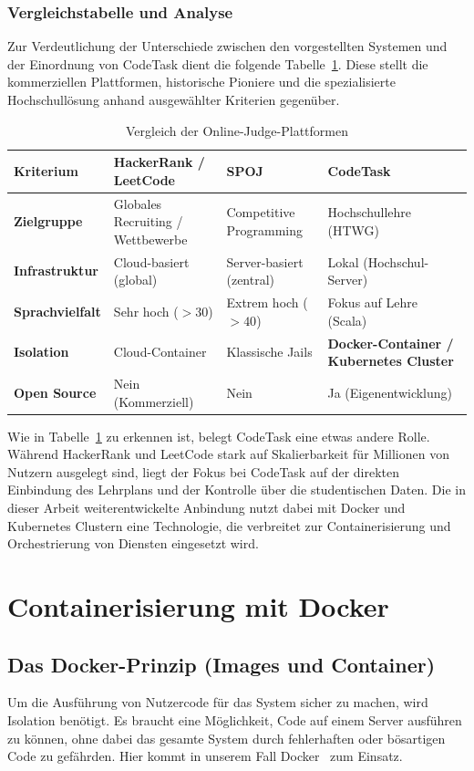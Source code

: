 	\subsubsection{Vergleichstabelle und Analyse}
	Zur Verdeutlichung der Unterschiede zwischen den vorgestellten Systemen und der Einordnung von CodeTask dient die folgende Tabelle~\ref{tab:vergleich_systeme}. Diese stellt die kommerziellen Plattformen,
	historische Pioniere und die spezialisierte Hochschullösung anhand ausgewählter Kriterien gegenüber.
	   \begin{table}[htbp]
		\centering
		\caption{Vergleich der Online-Judge-Plattformen}
		\label{tab:vergleich_systeme}
			\begin{tabular}{p{3cm} p{3.5cm} p{3.5cm} p{3.5cm}}
				\textbf{Kriterium} & \textbf{HackerRank / LeetCode} & \textbf{SPOJ} & \textbf{CodeTask} \\
				\hline
				\textbf{Zielgruppe} & Globales Recruiting / Wettbewerbe & Competitive Programming & Hochschullehre (HTWG) \\
				\textbf{Infrastruktur} & Cloud-basiert (global) & Server-basiert (zentral) & Lokal (Hochschul-Server) \\
				\textbf{Sprachvielfalt} & Sehr hoch ($>30$) & Extrem hoch ($>40$) & Fokus auf Lehre (Scala) \\
				\textbf{Isolation} & Cloud-Container & Klassische Jails & \textbf{Docker-Container / Kubernetes Cluster} \\
				\textbf{Open Source} & Nein (Kommerziell) & Nein & Ja (Eigenentwicklung) \\
			\end{tabular}
		\end{table}	
		
	Wie in Tabelle~\ref{tab:vergleich_systeme} zu erkennen ist, belegt CodeTask eine etwas andere Rolle. Während HackerRank und LeetCode stark auf Skalierbarkeit für Millionen von Nutzern ausgelegt sind, liegt der Fokus bei CodeTask auf der direkten Einbindung des Lehrplans und der Kontrolle über die studentischen Daten. Die in dieser Arbeit weiterentwickelte Anbindung nutzt dabei mit Docker und Kubernetes Clustern eine Technologie, die verbreitet zur Containerisierung und Orchestrierung von Diensten eingesetzt wird.
	
\section{Containerisierung mit Docker}
\subsection{Das Docker-Prinzip (Images und Container)}
\label{sec:container}
	Um die Ausführung von Nutzercode für das System sicher zu machen, wird Isolation benötigt. Es braucht eine Möglichkeit, Code auf einem Server ausführen zu können, ohne dabei das gesamte System durch fehlerhaften oder bösartigen Code zu gefährden. Hier kommt in unserem Fall Docker~\cite{docker} zum Einsatz.
